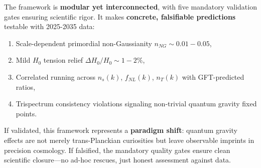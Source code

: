 \documentclass[12pt,a4paper]{article}
\begin{document}
The framework is \textbf{modular yet interconnected}, with five mandatory validation gates ensuring scientific rigor. It makes \textbf{concrete, falsifiable predictions} testable with 2025-2035 data:

\begin{enumerate}
\item Scale-dependent primordial non-Gaussianity \(n_{NG} \sim 0.01-0.05\),
\item Mild \(H_0\) tension relief \(\Delta H_0/H_0 \sim 1-2\%\),
\item Correlated running across \(n_s(k)\), \(f_{NL}(k)\), \(n_T(k)\) with GFT-predicted ratios,
\item Trispectrum consistency violations signaling non-trivial quantum gravity fixed points.
\end{enumerate}

If validated, this framework represents a \textbf{paradigm shift}: quantum gravity effects are not merely trans-Planckian curiosities but leave observable imprints in precision cosmology. If falsified, the mandatory quality gates ensure clean scientific closure—no ad-hoc rescues, just honest assessment against data.
\nocite{*}


\clearpage
\end{document}
